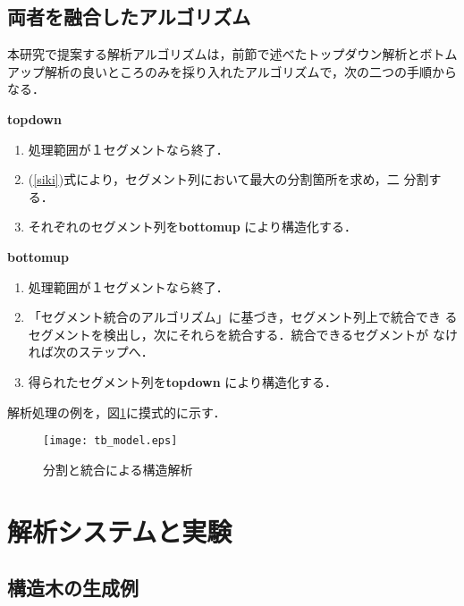\subsection{両者を融合したアルゴリズム}

本研究で提案する解析アルゴリズムは，前節で述べたトップダウン解析とボトム
アップ解析の良いところのみを採り入れたアルゴリズムで，次の二つの手順から
なる．
\begin{description}
\item{\bf topdown}
\begin{enumerate}
\item 処理範囲が１セグメントなら終了．
\item (\ref{siki})式により，セグメント列において最大の分割箇所を求め，二
      分割する．
\item それぞれのセグメント列を{\bf bottomup} により構造化する．
\end{enumerate}
\item{\bf bottomup}
\begin{enumerate}
\item 処理範囲が１セグメントなら終了．
\item 「セグメント統合のアルゴリズム」に基づき，セグメント列上で統合でき
      るセグメントを検出し，次にそれらを統合する．統合できるセグメントが
      なければ次のステップへ．
\item 得られたセグメント列を{\bf topdown} により構造化する．
\end{enumerate}
\end{description}

解析処理の例を，図\ref{tb_model}に摸式的に示す．
\begin{figure}
\begin{center}
\texttt{[image: tb\_model.eps]}
\caption{分割と統合による構造解析}\label{tb_model}
\end{center}
\end{figure}


\section{解析システムと実験}

\subsection{構造木の生成例}

